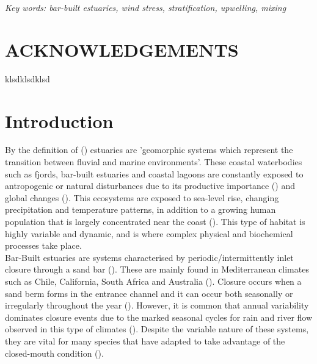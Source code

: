 \documentclass[11pt,letterpaper]{article}
\begin{document}
\textit{Key words: bar-built estuaries, wind stress, stratification, upwelling, mixing}

\newpage
\section*{ACKNOWLEDGEMENTS}

klsdklsdklsd
\newpage

\tableofcontents

\listoffigures

\listoftables

\newpage

\section{Introduction}



By the definition of \citeauthor{mcsweeney2017intermittently} (\cite*{mcsweeney2017intermittently}) estuaries are 'geomorphic systems which represent the transition between fluvial and marine environments'. These coastal waterbodies such as fjords, bar-built estuaries and coastal lagoons are constantly exposed to antropogenic or natural disturbances due to its productive importance (\cite{schernewski2002baltic, martinez2007coasts}) and global changes (\cite{grez2020evidence}). This ecosystems are exposed to sea-level rise, changing precipitation and temperature patterns, in addition to a growing human population that is largely concentrated near the coast (\cite{neumann2015future}). This type of habitat is highly variable and dynamic, and is where complex physical and biochemical processes take place.\\

Bar-Built estuaries are systems characterised by periodic/intermittently inlet closure through a sand bar (\cite{whitfield2007review}). These are mainly found in Mediterranean climates such as Chile, California, South Africa and Australia (\cite{mcsweeney2017intermittently}). Closure occurs when a sand berm forms in the entrance channel and it can occur both seasonally or irregularly throughout the year (\cite{Behrens2013}). However, it is common that annual variability dominates closure events due to the marked seasonal cycles for rain and river flow observed in this type of climates (\cite{Ranasinghe2003}). Despite the variable nature of these systems, they are vital for many species that have adapted to take advantage of the closed-mouth condition (\cite{viaroli2008community}).\\
\end{document}
